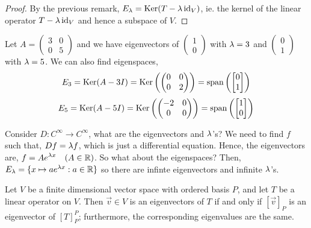 \documentclass{article}
\begin{document}
\begin{proof}
  By the previous remark, $E_\lambda = \operatorname{Ker} (T - \lambda\operatorname{id}_V)$, ie. the kernel of the linear operator $T - \lambda\operatorname{id}_V$ and hence a subspace of $V$.
\end{proof}

\begin{eg}
  Let $\displaystyle{A = \begin{pmatrix}
    3 & 0 \\ 0 & 5
  \end{pmatrix}}$ and we have eigenvectors of $\displaystyle{\begin{pmatrix}
    1 \\ 0
  \end{pmatrix}}$ with $\lambda = 3$ and $\displaystyle{\begin{pmatrix}
    0 \\ 1
  \end{pmatrix}}$ with $\lambda = 5$. We can also find eigenspaces,
  $$ E_3 = \operatorname{Ker} (A - 3I) = \operatorname{Ker} \left( \begin{pmatrix}
    0 & 0 \\ 0 & 2
  \end{pmatrix} \right) = \operatorname{span} \left( \begin{bmatrix}
    0 \\ 1
  \end{bmatrix} \right)$$
  $$ E_5 = \operatorname{Ker} (A - 5I) = \operatorname{Ker} \left( \begin{pmatrix}
    -2 & 0 \\ 0 & 0
  \end{pmatrix} \right) = \operatorname{span} \left( \begin{bmatrix}
    1 \\ 0
  \end{bmatrix} \right)$$
\end{eg}

Consider $D : C^\infty \to C^\infty$, what are the eigenvectors and $\lambda$'s? We need to find $f$ such that, $Df = \lambda f$, which is just a differential equation. Hence, the eigenvectors are, $\displaystyle{f = Ae^{\lambda x}} \quad (A \in \mathbb{R})$. So what about the eigenspaces? Then, $E_\lambda = \{ x \mapsto ae^{\lambda x} : a \in \mathbb{R} \}$ so there are infinte eigenvectors and infinite $\lambda$'s.

\begin{nthm}
  Let $V$ be a finite dimensional vector space with ordered basis $P$, and let $T$ be a linear operator on $V$. Then $\vec v \in V$ is an eigenvectors of $T$ if and only if $[\vec v]_P$ is an eigenvector of $[T]_P^P$; furthermore, the corresponding eigenvalues are the same.
\end{nthm}
\end{document}
